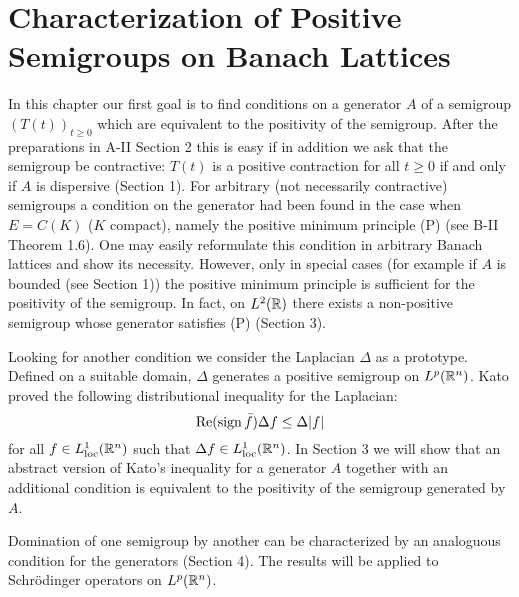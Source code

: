 
\chapter{Characterization of Positive Semigroups on Banach Lattices}
\label{chap:c2}

%
%
%
%
%
%

In this chapter our first goal is to find conditions on a generator $A$ of a semigroup $(T(t))_{t \geq 0}$ which are equivalent to the positivity of the semigroup.
After the preparations in A-II Section 2 this is easy if in addition we ask that the semigroup be contractive: $T(t)$ is a positive contraction for all $t \geq 0$ if and only if $A$ is dispersive (Section 1).
For arbitrary (not necessarily contractive) semigroups a condition on the generator had been found in the case when $E = C(K)$ ($K$ compact), namely the positive minimum principle (P) (see B-II Theorem 1.6).
One may easily reformulate this condition in arbitrary Banach lattices and show its necessity.
However, only in special cases (for example if $A$ is bounded (see Section 1)) the positive minimum principle is sufficient for the positivity of the semigroup.
In fact, on $L^2(\mathbb{R})$ there exists a non-positive semigroup whose generator satisfies (P) (Section 3).

Looking for another condition we consider the Laplacian $\Delta$ as a prototype.
Defined on a suitable domain, $\Delta$ generates a positive semigroup on $L^p(\mathbb{R}^n)$.
Kato proved the following distributional inequality for the Laplacian:
\[
\mathop{}\!\mathrm{Re}(\operatorname{sign} \bar{f}) \Delta f \leq \Delta|f|
\]
for all $f \in L^1_{\text{loc}}(\mathbb{R}^{n})$ such that $\Delta f \in L^1_{\text{loc}}(\mathbb{R}^{n})$.
In Section 3 we will show that an abstract version of Kato's inequality for a generator $A$ together with an additional condition is equivalent to the positivity of the semigroup generated by $A$.

Domination of one semigroup by another can be characterized by an analoguous condition for the generators (Section 4).
The results will be applied to Schrödinger operators on $L^p(\mathbb{R}^n)$.

